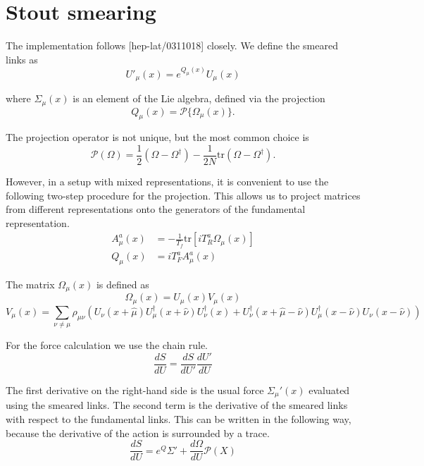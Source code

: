 \documentclass[12pt]{article}
\newcommand{\tr}{\mathrm{tr}}
\newcommand{\cP}{\mathcal{P}}
\begin{document}
\section*{Stout smearing}
The implementation follows [hep-lat/0311018] closely. We define the smeared links as
\begin{equation}
 U'_\mu(x) = e^{Q_\mu(x)}U_\mu(x)
\end{equation}

where $\Sigma_\mu(x)$ is an element of the Lie algebra, defined via the projection
\begin{equation}
 Q_\mu(x) = \cP\{\Omega_\mu(x)\}.
\end{equation}

The projection operator is not unique, but the most common choice is
\begin{equation}
 \cP(\Omega) = \frac{1}{2}(\Omega-\Omega^\dagger) - \frac{1}{2N}\tr(\Omega-\Omega^\dagger).
\end{equation}

However, in a setup with mixed representations, it is convenient to use the following two-step procedure for the projection. This allows us to project matrices from different representations onto the generators of the fundamental representation.
\begin{align}
 A_\mu^a(x) &= -\frac{1}{T_f}\tr[iT^a_R\Omega_\mu(x)] \\
 Q_\mu(x) &= iT^a_F A_\mu^a(x)
\end{align}

The matrix $\Omega_\mu(x)$ is defined as
\begin{equation}
 \Omega_\mu(x) = U_\mu(x)V_\mu(x)
\end{equation}
\begin{equation}
 V_\mu(x) = \sum_{\nu\neq\mu}
 \rho_{\mu\nu}\left(
 U_\nu(x+\hat{\mu})U_\mu^\dagger(x+\hat{\nu})U_\nu^\dagger(x) +
 U_\nu^\dagger(x+\hat{\mu}-\hat{\nu})U_\mu^\dagger(x-\hat{\nu})U_\nu(x-\hat{\nu})
 \right)
\end{equation}

For the force calculation we use the chain rule.
\begin{equation}
 \frac{dS}{dU} = \frac{dS}{dU'}\frac{dU'}{dU}
\end{equation}

The first derivative on the right-hand side is the usual force $\Sigma_\mu'(x)$ evaluated using the smeared links. The second term is the derivative of the smeared links with respect to the fundamental links. This can be written in the following way, because the derivative of the action is surrounded by a trace.
\begin{equation}
 \frac{dS}{dU} = e^Q\Sigma' + \frac{d\Omega}{dU}\cP(X)
\end{equation}
\end{document}
